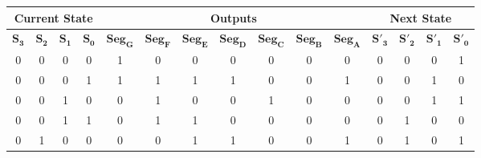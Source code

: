 \documentclass[12pt]{article}
\begin{document}
\begin{enumerate}
  \begin{table}[ht]
    \centering
    \begin{tabular}{ | c | c | c | c || c | c | c | c | c | c | c || c | c | c | c | }
    \hline
    \multicolumn{4}{|c||}{\textbf{Current State}}                     & \multicolumn{7}{c||}{\textbf{Outputs}}                                                                                                                                                            & \multicolumn{4}{c|}{\textbf{Next State}}                              \\ \hline
    $\mathbf{S_3}$ & $\mathbf{S_2}$ & $\mathbf{S_1}$ & $\mathbf{S_0}$ & $\mathbf{\textbf{Seg}_G}$ & $\mathbf{\textbf{Seg}_F}$ & $\mathbf{\textbf{Seg}_E}$ & $\mathbf{\textbf{Seg}_D}$ & $\mathbf{\textbf{Seg}_C}$ & $\mathbf{\textbf{Seg}_B}$ & $\mathbf{\textbf{Seg}_A}$ & $\mathbf{S'_3}$ & $\mathbf{S'_2}$ & $\mathbf{S'_1}$ & $\mathbf{S'_0}$ \\ \hline
    0              & 0              & 0              & 0              & 1                         & 0                         & 0                         & 0                         & 0                         & 0                         & 0                         & 0               & 0               & 0               & 1               \\ \hline
    0              & 0              & 0              & 1              & 1                         & 1                         & 1                         & 1                         & 0                         & 0                         & 1                         & 0               & 0               & 1               & 0               \\ \hline
    0              & 0              & 1              & 0              & 0                         & 1                         & 0                         & 0                         & 1                         & 0                         & 0                         & 0               & 0               & 1               & 1               \\ \hline
    0              & 0              & 1              & 1              & 0                         & 1                         & 1                         & 0                         & 0                         & 0                         & 0                         & 0               & 1               & 0               & 0               \\ \hline
    0              & 1              & 0              & 0              & 0                         & 0                         & 1                         & 1                         & 0                         & 0                         & 1                         & 0               & 1               & 0               & 1               \\ \hline

\end{tabular}
\end{table}
\end{enumerate}
\end{document}
